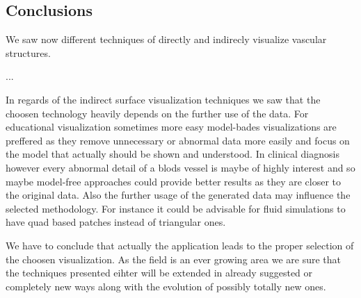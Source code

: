\subsection{Conclusions}

We saw now different techniques of directly and indirecly visualize vascular structures. 

...

In regards of the indirect surface visualization techniques we saw that the choosen technology heavily depends on the further use of the data. For educational visualization sometimes more easy model-bades visualizations are preffered as they remove unnecessary or abnormal data more easily and focus on the model that actually should be shown and understood. In clinical diagnosis however every abnormal detail of a blods vessel is maybe of highly interest and so maybe model-free approaches could provide better results as they are closer to the original data. Also the further usage of the generated data may influence the selected methodology. For instance it could be advisable for fluid simulations to have quad based patches instead of triangular ones.

We have to conclude that actually the application leads to the proper selection of the choosen visualization. 
As the field is an ever growing area we are sure that the techniques presented eihter will be extended in already suggested or completely new ways along with the evolution of possibly totally new ones. 